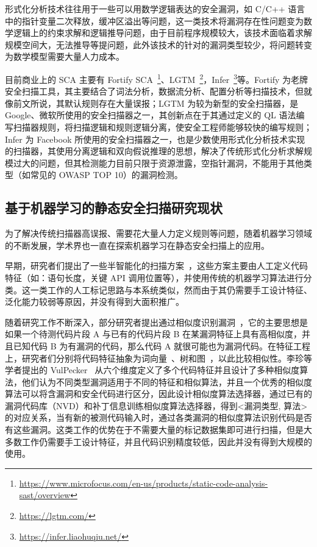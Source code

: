 形式化分析技术往往用于一些可以用数学逻辑表达的安全漏洞，如 C/C++ 语言中的指针变量二次释放，缓冲区溢出等问题，这一类技术将漏洞存在性问题变为数学逻辑上的约束求解和逻辑推导问题，由于目前程序规模较大，该技术面临着求解规模空间大，无法推导等提问题，此外该技术的针对的漏洞类型较少，将问题转变为数学模型需要大量人力成本。

目前商业上的 SCA 主要有 Fortify SCA~\footnote{\url{https://www.microfocus.com/en-us/products/static-code-analysis-sast/overview}}、LGTM~\footnote{\url{https://lgtm.com/}}，Infer~\footnote{\url{https://infer.liaohuqiu.net/}}等。Fortify 为老牌安全扫描工具，其主要结合了词法分析，数据流分析、配置分析等扫描技术，但就像前文所说，其默认规则存在大量误报；LGTM 为较为新型的安全扫描器，是 Google、微软所使用的安全扫描器之一，其创新点在于其通过定义的 QL 语法编写扫描器规则，将扫描逻辑和规则逻辑分离，使安全工程师能够较快的编写规则；Infer 为 Facebook 所使用的安全扫描器之一，也是少数使用形式化分析技术实现的扫描器，其使用分离逻辑和双向假说推理的思想，解决了传统形式化分析求解规模过大的问题，但其检测能力目前只限于资源泄露，空指针漏洞，不能用于其他类型（如常见的 OWASP TOP 10）的漏洞检测。\\

\subsection{基于机器学习的静态安全扫描研究现状}

为了解决传统扫描器高误报、需要花大量人力定义规则等问题，随着机器学习领域的不断发展，学术界也一直在探索机器学习在静态安全扫描上的应用。

早期，研究者们提出了一些半智能化的扫描方案~\cite{aletheia,zranking,ayukselCaseStudy}，这些方案主要由人工定义代码特征（如：语句长度，关键 API 调用位置等），并使用传统的机器学习算法进行分类。这一类工作的人工标记思路与本系统类似，然而由于其仍需要手工设计特征、泛化能力较弱等原因，并没有得到大面积推广。

随着研究工作不断深入，部分研究者提出通过相似度识别漏洞~\cite{vuddy,li2016vulpecker}，它的主要思想是如果一个待测代码片段 A 与已有的代码片段 B 在某漏洞特征上具有高相似度，并且已知代码 B 为有漏洞的代码，那么代码 A 就很可能也为漏洞代码。在特征工程上，研究者们分别将代码特征抽象为词向量~\cite{vuddy}、树和图~\cite{simtree}，以此比较相似性。李珍等学者提出的 VulPecker~\cite{li2016vulpecker} 从六个维度定义了多个代码特征并且设计了多种相似度算法，他们认为不同类型漏洞适用于不同的特征和相似算法，并且一个优秀的相似度算法可以将含漏洞和安全代码进行区分，因此设计相似度算法选择器，通过已有的漏洞代码库（NVD）和补丁信息训练相似度算法选择器，得到<漏洞类型, 算法>的对应关系，当有新的被测代码输入时，通过各类漏洞的相似度算法识别代码是否有这些漏洞。这类工作的优势在于不需要大量的标记数据集即可进行扫描，但是大多数工作仍需要手工设计特征，并且代码识别精度较低，因此并没有得到大规模的使用。

